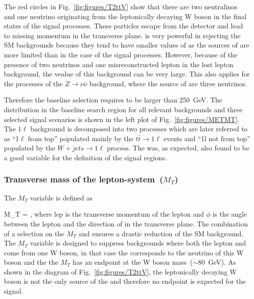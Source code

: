 The red circles in Fig.~\ref{fig:figures/T2ttV} show that there are two neutralinos and one neutrino originating from the leptonically decaying W boson  in the final states of the signal processes. These particles escape from the detector and lead to missing momentum in the transverse plane. \MET is very powerful in rejecting the SM backgrounds because they tend to have smaller values of \MET as the sources of \MET are more limited than in  the case of the signal processes. However, because of the presence of two neutrinos and one misreconstructed lepton in the lost lepton background, the \MET vealue of this background can be very large. This also applies for the processes of the $Z \to \nu \bar{\nu}$ background, where the source of \MET are three neutrinos.

Therefore the baseline selection requires \MET to be larger than 250~GeV. The \MET distribution in the baseline search region for all relevant backgrounds and three selected signal scenarios is shown in the left plot of Fig.~\ref{fig:figures/METMT}. The $1\ell$ background is decomposed into two processes which are later referred to as ``1$\ell$ from top'' populated mainly by the $t \bar{t} \to 1\ell$ events and ``1l not from top'' populated by the $W+jets \to 1\ell$  process. The \MET was, as expected, also found to be a good variable for the definition of the signal regions.


\subsubsection{Transverse mass of the lepton-\MET system~($M_{T}$)}

The $M_{T}$ variable is defined as

{
 M_{T} =  ,
}
where $\mathrm{lep}$ is the transverse momentum of the lepton and $\phi$ is the angle between the lepton and the direction of \MET in the transverse plane. The combination of a selection on the $M_{T}$ and \MET ensures a drastic reduction of the SM background. The $M_{T}$ variable is  designed to suppress backgrounds where both the lepton and \MET come from one W boson, in that case the \MET corresponds to the neutrino of this W boson and the the $M_{T}$ has an endpoint at the W boson mass~($\sim$80~GeV). As shown in the diagram of Fig.~\ref{fig:figures/T2ttV}, the leptonically decaying W boson is not the only source of the \MET and therefore no endpoint is expected for the signal.


